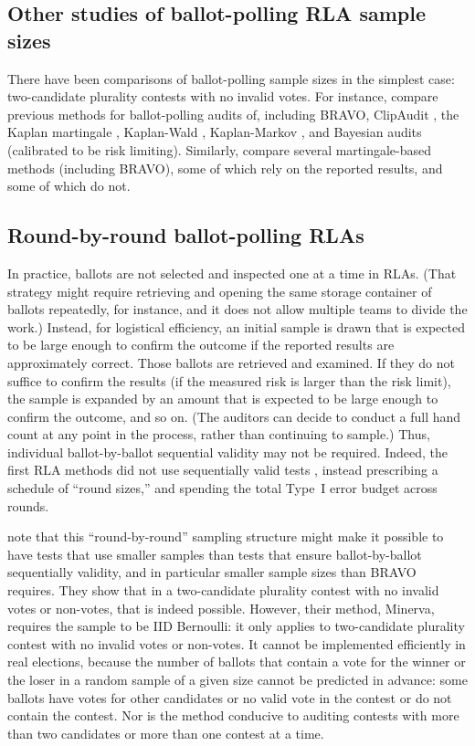\documentclass[12pt,runningheads]{llncs}
\begin{document}
{\subsection{Other studies of ballot-polling RLA sample sizes}
There have been comparisons of ballot-polling sample sizes in the simplest case:
two-candidate plurality contests with no invalid votes.
For instance,
\cite{huangEtal20} compare previous methods for ballot-polling audits of, including BRAVO, ClipAudit \cite{rivest17}, the Kaplan martingale \cite{stark20}, 
Kaplan-Wald \cite{stark09b,stark20}, Kaplan-Markov \cite{stark09b,stark20}, and Bayesian audits \cite{rivestShen12,rivest18} 
(calibrated to be risk limiting).
Similarly, \cite{waudby-smithEtal21} compare several martingale-based methods (including BRAVO), some of which
rely on the reported results, and some of which do not.

\subsection{Round-by-round ballot-polling RLAs}
In practice, ballots are not selected and inspected one at a time in RLAs.
(That strategy might require retrieving and opening the same storage container of ballots repeatedly, for instance, and it does not allow
multiple teams to divide the work.)
Instead, for logistical efficiency, an initial sample is drawn that is expected to be large enough to confirm the outcome if the 
reported results are approximately correct.
Those ballots are retrieved and examined.
If they do not suffice to confirm the results (if the measured risk is larger than the risk limit), 
the sample is expanded by an amount that is expected to be large enough
to confirm the outcome, and so on.
(The auditors can decide to conduct a full hand count at any point in the process, rather than continuing to sample.)
Thus, individual ballot-by-ballot sequential validity may not be required.
Indeed, the first RLA methods did not use sequentially valid tests \cite{stark08a,stark09a},
instead prescribing a schedule of ``round sizes,'' and spending the total Type~I error budget across rounds.

\cite{zagorskiEtal21} note that this ``round-by-round'' sampling structure might make it possible to have tests that 
use smaller samples than tests that ensure ballot-by-ballot sequentially validity, and in particular smaller sample sizes than BRAVO
requires.
They show that in a two-candidate plurality contest with no invalid votes or non-votes, that is indeed
possible.
However, their method, Minerva, requires the sample to be IID Bernoulli:
it only applies to  two-candidate plurality contest with no invalid votes or non-votes.
It cannot be implemented efficiently in real elections, because the number of ballots that contain a vote for the winner or the
loser in a random sample of a given size cannot be predicted in advance: some ballots have votes for other candidates or no valid vote in the contest or do not contain the contest.
Nor is the method conducive to auditing contests with more than two candidates or more than one contest at a time.

}
\end{document}
